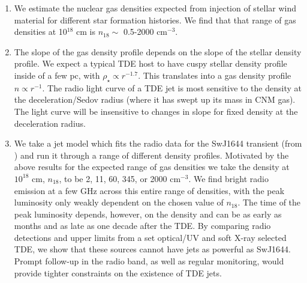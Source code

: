 \documentclass[usenatbib,fleqn]{mnras}
\begin{document}
\begin{enumerate}
\item We estimate the nuclear gas densities expected from injection of
  stellar wind material for different star formation histories. We
  find that that range of gas densities at 10$^{18}$ cm is $n_{18}
  \sim$ 0.5-2000 cm$^{-3}$.

\item The slope of the gas density profile depends on the slope of the
  stellar density profile. We expect a typical TDE host to have cuspy
  stellar density profile inside of a few pc, with $\rho_\star
  \propto r^{-1.7}$. This translates into a gas density profile $n
  \propto r^{-1}$. The radio light curve of a TDE jet is most
  sensitive to the density at the deceleration/Sedov radius (where it
  has swept up its mass in CNM gas). The light curve will be
  insensitive to changes in slope for fixed density at the
  deceleration radius.

\item We take a jet model which fits the radio data for the SwJ1644
  transient (from \citealt{Mimica+2015}) and run it through a range of
  different density profiles. Motivated by the above results for the
  expected range of gas densities we take the density at $10^{18}$ cm,
  $n_{18}$, to be 2, 11, 60, 345, or 2000 cm$^{-3}$. We find bright
  radio emission at a few GHz across this entire range of densities,
  with the peak luminosity only weakly dependent on the chosen value
  of $n_{18}$. The time of the peak luminosity depends, however, on
  the density and can be as early as months and as late as one decade
  after the TDE. By comparing radio detections and upper limits from a
  set optical/UV and soft X-ray selected TDE, we show that these
  sources cannot have jets as powerful as SwJ1644. Prompt follow-up in
  the radio band, as well as regular monitoring, would provide tighter
  constraints on the existence of TDE jets.
\end{enumerate}

\appendix
\end{document}

